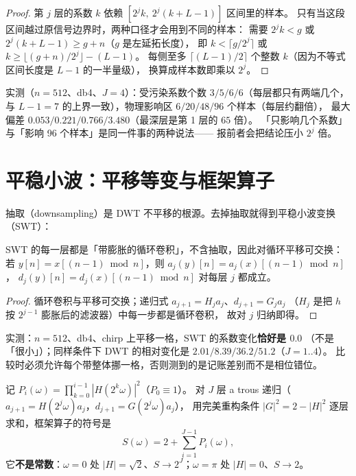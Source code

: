 \begin{proof}
第 $j$ 层的系数 $k$ 依赖 $[2^jk,\ 2^j(k+L-1)]$ 区间里的样本。
只有当这段区间越过原信号边界时，两种口径才会用到不同的样本：
需要 $2^jk<g$ 或 $2^j(k+L-1)\ge g+n$（$g$ 是左延拓长度），
即 $k<\lceil g/2^j\rceil$ 或 $k\ge\lfloor(g+n)/2^j\rfloor-(L-1)$。
每侧至多 $\lceil(L-1)/2\rceil$ 个整数 $k$（因为不等式区间长度是 $L-1$ 的一半量级），
换算成样本数即乘以 $2^j$。
\end{proof}

实测（$n=512$、db4、$J=4$）：受污染系数个数 $3/5/6/6$（每层都只有两端几个，
与 $L-1=7$ 的上界一致），物理影响区 $6/20/48/96$ 个样本（每层约翻倍），
最大偏差 $0.053/0.221/0.766/3.480$（最深层是第 1 层的 $65$ 倍）。
「只影响几个系数」与「影响 96 个样本」是同一件事的两种说法——
报前者会把结论压小 $2^j$ 倍。

\section{平稳小波：平移等变与框架算子}

抽取（downsampling）是 DWT 不平移的根源。去掉抽取就得到平稳小波变换（SWT）：

\begin{theorem}
\label{thm:swt-shift}
SWT 的每一层都是「带膨胀的循环卷积」，不含抽取，因此对循环平移可交换：
若 $y[n]=x[(n-1)\bmod n]$，则 $a_j(y)[n]=a_j(x)[(n-1)\bmod n]$，
$d_j(y)[n]=d_j(x)[(n-1)\bmod n]$ 对每层 $j$ 都成立。
\end{theorem}

\begin{proof}
循环卷积与平移可交换；递归式 $a_{j+1}=H_j a_j$、$d_{j+1}=G_j a_j$
（$H_j$ 是把 $h$ 按 $2^{j-1}$ 膨胀后的滤波器）中每一步都是循环卷积，
故对 $j$ 归纳即得。
\end{proof}

实测：$n=512$、db4、chirp 上平移一格，SWT 的系数变化\textbf{恰好是 $0.0$}
（不是「很小」）；同样条件下 DWT 的相对变化是 $2.01/8.39/36.2/51.2$（$J=1..4$）。
比较时必须允许每个带整体挪一格，否则测到的是记账差别而不是相位错位。

\begin{theorem}
\label{thm:swt-frame}
记 $P_i(\omega)=\prod_{k=0}^{i-1}|H(2^k\omega)|^2$（$P_0\equiv1$）。
对 $J$ 层 a trous 递归（$a_{j+1}=H(2^j\omega)a_j$，$d_{j+1}=G(2^j\omega)a_j$），
用完美重构条件 $|G|^2=2-|H|^2$ 逐层求和，框架算子的符号是
\[
S(\omega)=2+\sum_{i=1}^{J-1}P_i(\omega),
\]
它\textbf{不是常数}：$\omega=0$ 处 $|H|=\sqrt2$、$S\to2^J$；$\omega=\pi$ 处 $|H|=0$、$S\to2$。
\end{theorem}

